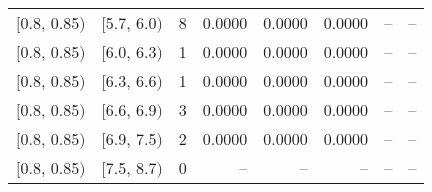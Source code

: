 \begin{longtable}{| l | l | r | r | r | r | r | r |}
        $[$0.8, 0.85$)$ & $[$5.7, 6.0$)$ & 8 & 0.0000 & 0.0000 & 0.0000 & -- & -- \\
        $[$0.8, 0.85$)$ & $[$6.0, 6.3$)$ & 1 & 0.0000 & 0.0000 & 0.0000 & -- & -- \\
        $[$0.8, 0.85$)$ & $[$6.3, 6.6$)$ & 1 & 0.0000 & 0.0000 & 0.0000 & -- & -- \\
        $[$0.8, 0.85$)$ & $[$6.6, 6.9$)$ & 3 & 0.0000 & 0.0000 & 0.0000 & -- & -- \\
        $[$0.8, 0.85$)$ & $[$6.9, 7.5$)$ & 2 & 0.0000 & 0.0000 & 0.0000 & -- & -- \\
        $[$0.8, 0.85$)$ & $[$7.5, 8.7$)$ & 0 & -- & -- & -- & -- & -- \\
\end{longtable}
